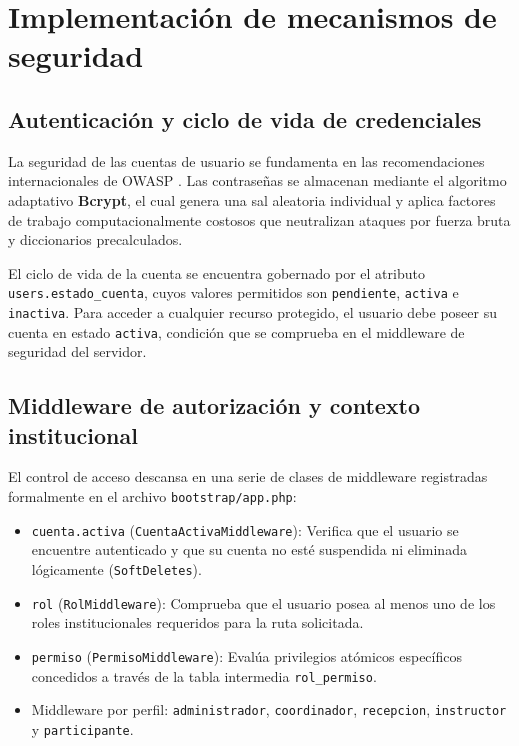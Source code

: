 \section{Implementación de mecanismos de seguridad}
\label{sec:seguridad}

\subsection{Autenticación y ciclo de vida de credenciales}
\label{sec:seguridad_autenticacion}

La seguridad de las cuentas de usuario se fundamenta en las recomendaciones internacionales de OWASP \cite{owasp2026password}. Las contraseñas se almacenan mediante el algoritmo adaptativo \textbf{Bcrypt}, el cual genera una sal aleatoria individual y aplica factores de trabajo computacionalmente costosos que neutralizan ataques por fuerza bruta y diccionarios precalculados.

El ciclo de vida de la cuenta se encuentra gobernado por el atributo \texttt{users.estado\_cuenta}, cuyos valores permitidos son \texttt{pendiente}, \texttt{activa} e \texttt{inactiva}. Para acceder a cualquier recurso protegido, el usuario debe poseer su cuenta en estado \texttt{activa}, condición que se comprueba en el middleware de seguridad del servidor.

\subsection{Middleware de autorización y contexto institucional}
\label{sec:middleware_seguridad}

El control de acceso descansa en una serie de clases de middleware registradas formalmente en el archivo \texttt{bootstrap/app.php}:
\begin{itemize}
    \item \texttt{cuenta.activa} (\texttt{CuentaActivaMiddleware}): Verifica que el usuario se encuentre autenticado y que su cuenta no esté suspendida ni eliminada lógicamente (\texttt{SoftDeletes}).
    \item \texttt{rol} (\texttt{RolMiddleware}): Comprueba que el usuario posea al menos uno de los roles institucionales requeridos para la ruta solicitada.
    \item \texttt{permiso} (\texttt{PermisoMiddleware}): Evalúa privilegios atómicos específicos concedidos a través de la tabla intermedia \texttt{rol\_permiso}.
    \item Middleware por perfil: \texttt{administrador}, \texttt{coordinador}, \texttt{recepcion}, \texttt{instructor} y \texttt{participante}.
\end{itemize}

